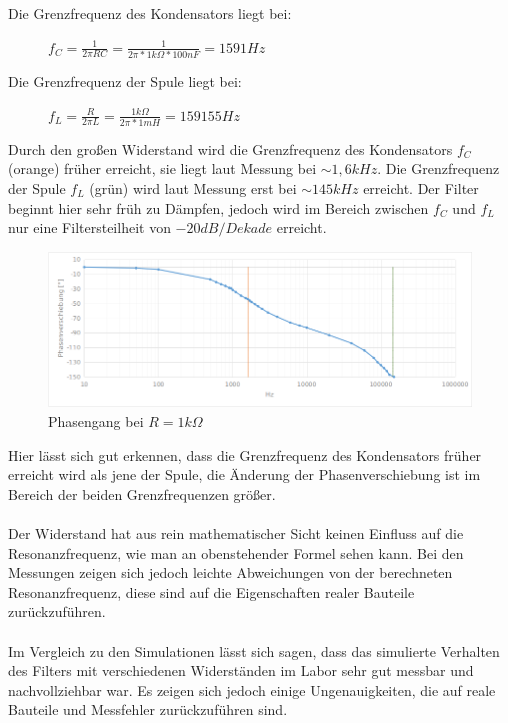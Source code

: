 \documentclass[12pt,a4paper,titlepage]{article}
\begin{document}
\noindent Die Grenzfrequenz des Kondensators liegt bei:
\begin{figure}[H]
  \centering
  $f_C = \frac{1}{2\pi RC} = \frac{1}{2\pi *1k\Omega*100nF} = 1591Hz$
\end{figure}

\noindent Die Grenzfrequenz der Spule liegt bei:
\begin{figure}[H]
  \centering
$f_L = \frac{R}{2\pi L} = \frac{1k\Omega}{2\pi *1mH} = 159155Hz$
\end{figure}

\noindent Durch den großen Widerstand wird die Grenzfrequenz des Kondensators $f_C$ (orange) früher erreicht, sie liegt laut Messung bei $\sim1,6kHz$. Die Grenzfrequenz der Spule $f_L$ (gr\"un) wird laut Messung erst bei $\sim145kHz$ erreicht. Der Filter beginnt hier sehr früh zu Dämpfen, jedoch wird im Bereich zwischen $f_C$ und $f_L$ nur eine Filtersteilheit von $-20dB/Dekade$ erreicht.

\begin{figure}[H]
  \centering
  \includegraphics[width=150mm]{phasengang_rlc_1k.png}
  \caption{Phasengang bei $R=1k\Omega$}
\end{figure}

\noindent Hier l\"asst sich gut erkennen, dass die Grenzfrequenz des Kondensators fr\"uher erreicht wird als jene der Spule, die Änderung der Phasenverschiebung ist im Bereich der beiden Grenzfrequenzen gr\"oßer.\\\\

\noindent Der Widerstand hat aus rein mathematischer Sicht keinen Einfluss auf die Resonanzfrequenz, wie man an obenstehender Formel sehen kann. Bei den Messungen zeigen sich jedoch leichte Abweichungen von der berechneten Resonanzfrequenz, diese sind auf die Eigenschaften realer Bauteile zurückzuführen.\\\\

\noindent Im Vergleich zu den Simulationen lässt sich sagen, dass das simulierte Verhalten des Filters mit verschiedenen Widerständen im Labor sehr gut messbar und nachvollziehbar war. Es zeigen sich jedoch einige Ungenauigkeiten, die auf reale Bauteile und Messfehler zurückzuführen sind.\\\\
\end{document}
